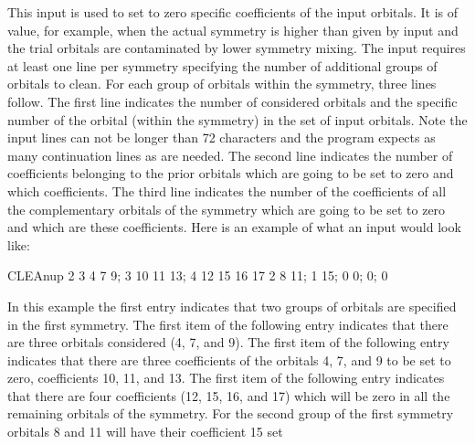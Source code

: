 \begin{keywordlist}
This input is used to set to zero specific coefficients of the input
orbitals. It is of value, for example, when the actual symmetry is
higher than given by input and the trial orbitals are contaminated
by lower symmetry mixing. The input requires at least one line
per symmetry specifying the number of additional groups of orbitals
to clean. For each group of orbitals within the symmetry, three lines
follow. The first line indicates the number of considered orbitals
and the specific number of the orbital (within the symmetry) in the
set of input orbitals. Note the input lines can not be longer than 72
characters and the program expects as many continuation lines as are
needed. The second line indicates the number of
coefficients belonging to the prior orbitals which are going to be
set to zero and which coefficients. The third line indicates the
number of the coefficients of all the complementary orbitals of
the symmetry which are going to be set to zero and which are these
coefficients.  Here is an example of what an input would look like:
\begin{inputlisting}
CLEAnup
2
   3 4 7 9; 3 10 11 13; 4 12 15 16 17
   2 8 11; 1 15; 0
0; 0; 0
\end{inputlisting}
In this example the first entry indicates that two groups of orbitals are
specified in the first symmetry. The first item of the
following entry indicates that there are three orbitals considered
(4, 7, and 9). The first item of the following entry indicates that there
are three coefficients of the orbitals 4, 7, and 9 to be set to zero,
coefficients 10, 11, and 13. The first item of the following entry indicates
that there are four coefficients (12, 15, 16, and 17) which will be zero
in all the remaining orbitals of the symmetry. For the second group of
the first symmetry orbitals 8 and 11 will have their coefficient 15 set

\end{keywordlist}
